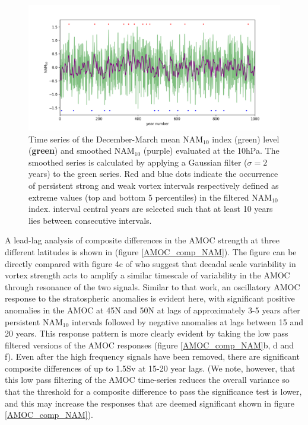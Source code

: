 \begin{figure}[h!]
\begin{center}
\noindent\includegraphics[width = \linewidth]{Figures/Figures-surface/NAM_and_filtered.png} 
\caption{Time series of the December-March mean NAM$_{10}$ index (green) level (\textbf{green}) and smoothed NAM$_{10}$ (purple) evaluated at the 10hPa. The smoothed series is calculated by applying a Gaussian filter ($\sigma = 2$ years) to the green series. Red and blue dots indicate the occurrence of persistent strong and weak vortex intervals respectively defined as extreme values (top and bottom 5 percentiles) in the filtered NAM$_{10}$ index. interval central years are selected such that at least 10 years lies between consecutive intervals.}
\label{NAM_and_filtered}
\end{center}
\end{figure}

A lead-lag analysis of composite differences in the AMOC strength at three different latitudes is shown in  (figure \ref{AMOC_comp_NAM}). The figure can be directly compared with figure 4c of \cite{reichlerStratospheric2012b} who suggest that decadal scale variability in vortex strength acts to amplify a similar timescale of variability in the AMOC through resonance of the two signals. Similar to that work, an oscillatory AMOC response to the stratospheric anomalies is evident here, with significant positive anomalies in the AMOC at 45N and 50N at lags of approximately 3-5 years after persistent NAM$_{10}$ intervals followed by negative anomalies at lags between 15 and 20 years. This response pattern is more clearly evident by taking the low pass filtered versions of the AMOC responses (figure \ref{AMOC_comp_NAM}b, d and f). Even after the high frequency signals have been removed, there are significant composite differences of up to 1.5Sv at 15-20 year lags. (We note, however, that this low pass filtering of the AMOC time-series reduces the overall variance so that the threshold for a composite difference to pass the significance test is lower, and this may increase the responses that are deemed significant shown in figure \ref{AMOC_comp_NAM}). 

